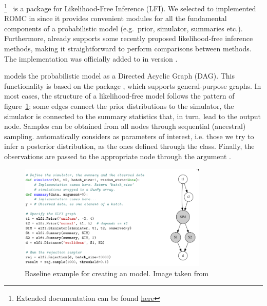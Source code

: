 \footnote{Extended
  documentation can be found
  \href{https://elfi.readthedocs.io/en/latest/}{here}}~\cite{1708.00707}
is a  package for Likelihood-Free Inference
(LFI). We selected to implemented ROMC in  since it provides
convenient modules for all the fundamental components of a
probabilistic model (e.g.\ prior, simulator, summaries
etc.). Furthermore,  already supports some recently proposed
likelihood-free inference methods, making it straightforward to
perform comparisons between methods. The implementation was officially
added to  in version .


 models the probabilistic model as a Directed Acyclic Graph
(DAG). This functionality is based on the package ,
which supports general-purpose graphs. In most cases, the structure of
a likelihood-free model follows the pattern of figure~\ref{fig:elfi};
some edges connect the prior distributions to the simulator, the
simulator is connected to the summary statistics that, in turn, lead
to the output node. Samples can be obtained from all nodes through
sequential (ancestral) sampling.  automatically considers as
parameters of interest, i.e. those we try to infer a posterior
distribution, as the ones defined through the 
class. Finally, the observations are passed to the appropriate node
through the argument
.

\begin{figure}[ht]
    \begin{center}
      \includegraphics[width=0.8\textwidth]{./latex_files/images/chapter2/elfi.png}
    \end{center}
    \caption[Baseline example for creating an  model]{Baseline example for creating an  model. Image taken from \cite{1708.00707}}
    \label{fig:elfi}
\end{figure}

